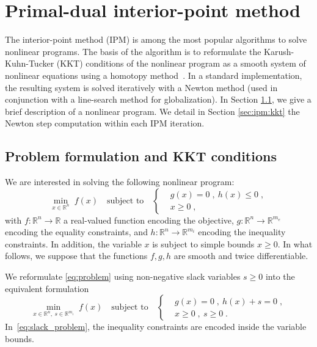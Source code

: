 \section{Primal-dual interior-point method}

The interior-point method (IPM) is among the most popular algorithms
to solve nonlinear programs. The basis of the algorithm is to
reformulate the Karush-Kuhn-Tucker (KKT) conditions of the nonlinear program as a smooth
system of nonlinear equations using a homotopy method~\cite{nocedal_numerical_2006}.
In a standard implementation, the
resulting system is solved iteratively with a Newton method (used in conjunction
with a line-search method for globalization). In Section \ref{sec:ipm:problem}, we
give a brief description of a nonlinear program.
We detail in Section \ref{sec:ipm:kkt} the Newton step computation within each IPM iteration.

\subsection{Problem formulation and KKT conditions}
\label{sec:ipm:problem}
We are interested in solving the following nonlinear program:
\begin{equation}
  \label{eq:problem}
    \min_{x \in \mathbb{R}^n} \;  f(x)
\quad \text{subject to}\quad
\left\{
  \begin{aligned}
    & g(x) = 0 \; , ~ h(x) \leq 0 \; , \\
      & x \geq 0  \; ,
  \end{aligned}
\right.
\end{equation}
with $f:\mathbb{R}^n \to \mathbb{R}$ a real-valued function
encoding the objective, $g: \mathbb{R}^n \to \mathbb{R}^{m_e}$
encoding the equality constraints, and $h: \mathbb{R}^{n} \to
\mathbb{R}^{m_i}$ encoding the inequality constraints.
In addition, the variable $x$ is subject to simple bounds $x \geq 0$.
In what follows, we suppose that the functions $f, g, h$ are smooth
and twice differentiable.

We reformulate \eqref{eq:problem} using non-negative slack variables $s \geq 0$
into the equivalent formulation
\begin{equation}
  \label{eq:slack_problem}
    \min_{x \in \mathbb{R}^n, ~ s \in \mathbb{R}^{m_i}} \;  f(x)
    \quad \text{subject to} \quad
    \left\{
  \begin{aligned}
    & g(x) = 0 \; , ~ h(x) + s = 0 \; , \\
      & x \geq 0  \; , ~ s \geq 0  \; .
  \end{aligned}
  \right.
\end{equation}
In~\eqref{eq:slack_problem}, the inequality constraints
are encoded inside the variable bounds.

